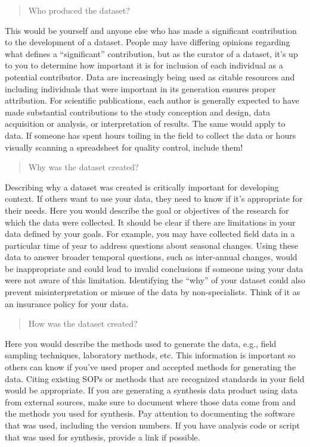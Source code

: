 \documentclass[
]{book}
\begin{document}
\begin{quote}
Who produced the dataset?
\end{quote}

This would be yourself and anyone else who has made a significant contribution to the development of a dataset. People may have differing opinions regarding what defines a ``significant'' contribution, but as the curator of a dataset, it's up to you to determine how important it is for inclusion of each individual as a potential contributor. Data are increasingly being used as citable resources and including individuals that were important in its generation ensures proper attribution. For scientific publications, each author is generally expected to have made substantial contributions to the study conception and design, data acquisition or analysis, or interpretation of results. The same would apply to data. If someone has spent hours toiling in the field to collect the data or hours visually scanning a spreadsheet for quality control, include them!

\begin{quote}
Why was the dataset created?
\end{quote}

Describing why a dataset was created is critically important for developing context. If others want to use your data, they need to know if it's appropriate for their needs. Here you would describe the goal or objectives of the research for which the data were collected. It should be clear if there are limitations in your data defined by your goals. For example, you may have collected field data in a particular time of year to address questions about seasonal changes. Using these data to answer broader temporal questions, such as inter-annual changes, would be inappropriate and could lead to invalid conclusions if someone using your data were not aware of this limitation. Identifying the ``why'' of your dataset could also prevent misinterpretation or misuse of the data by non-specialists. Think of it as an insurance policy for your data.

\begin{quote}
How was the dataset created?
\end{quote}

Here you would describe the methods used to generate the data, e.g., field sampling techniques, laboratory methods, etc. This information is important so others can know if you've used proper and accepted methods for generating the data. Citing existing SOPs or methods that are recognized standards in your field would be appropriate. If you are generating a synthesis data product using data from external sources, make sure to document where those data come from and the methods you used for synthesis. Pay attention to documenting the software that was used, including the version numbers. If you have analysis code or script that was used for synthesis, provide a link if possible.
\end{document}
